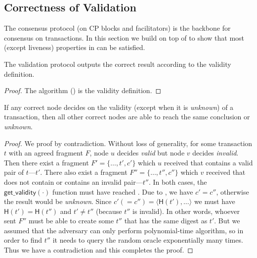 \subsection{Correctness of Validation}
The consensus protocol (on CP blocks and facilitators) is the backbone for consensus on transactions.
In this section we build on top of  to show that most (except liveness) properties in  can be satisfied.

\begin{lemma}
The validation protocol outputs the correct result
according to the validity definition.
\end{lemma}
\begin{proof}
The algorithm () is the validity definition.
\end{proof}

\begin{theorem}
\label{theorem:validation-agreement}
If any correct node decides on the validity (except when it is \emph{unknown}) of a transaction,
then all other correct nodes are able to reach the same conclusion or \emph{unknown}.
\end{theorem}
\begin{proof}
We proof by contradiction.
Without loss of generality, for some transaction $t$ with an agreed fragment $F$,
node $u$ decides \emph{valid} but node $v$ decides \emph{invalid}.
Then there exist a fragment $F' = \{ \dots, t', c'\}$ which $u$ received that contains a valid pair of $t$---$t'$.
There also exist a fragment $F'' = \{ \dots, t'', c''\}$ which $v$ received that does not contain or contains an invalid pair---$t''$.
In both cases, the $\textsf{get\_validity}(\cdot)$ function must have reached .
Due to , we have $c' = c''$, otherwise the result would be \emph{unknown}.
Since $c' (= c'') = \langle \textsf{H}(t'), \dots \rangle$ we must have $\textsf{H}(t') = \textsf{H}(t'')$ and $t' \ne t''$ (because $t''$ is invalid).
In other words, whoever sent $F''$ must be able to create some $t''$ that has the same digest as $t'$.
But we assumed that the adversary can only perform polynomial-time algorithm,
so in order to find $t''$ it needs to query the random oracle exponentially many times.
Thus we have a contradiction and this completes the proof.
\end{proof}

